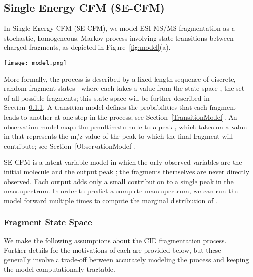\subsection{Single Energy CFM (SE-CFM)}
\label{sec:SE}

In Single Energy CFM (SE-CFM), we model ESI-MS/MS fragmentation as a stochastic, homogeneous, Markov process \citep{Cappe2005} involving state transitions between charged fragments, as depicted in Figure~\ref{fig:model}(a).
\begin{figure*}
\begin{center}
\texttt{[image: model.png]}
\caption{(a) Single Energy Competitive Fragmentation Model (SE-CFM): a stochastic, Markov process of state transitions between charged fragments. (b) Combined Energy Competitive Fragmentation Model (CE-CFM): an extension of SE-CFM that combines information from multiple collision energy spectra into one model. }\label{model}
\label{fig:model}
\end{center}
\end{figure*}

More formally, the process is described by a fixed length sequence of discrete, random fragment states , where each  takes a value from the state space
, 
the set of all possible fragments; this state space will be further described in Section~\ref{StateSpace}.
A transition model defines the probabilities that each fragment leads to another at one step in the process; see Section~\ref{TransitionModel}. 
An observation model maps the penultimate node  to a peak , which takes on a value in  that represents the m/z value of the peak to which the final fragment will contribute; see Section~\ref{ObservationModel}. 

SE-CFM is a latent variable model in which the only observed variables are the initial molecule  and the output peak ; the fragments themselves are never directly observed. 
Each output  adds only a small contribution to a single peak in the mass spectrum. In order to predict a complete mass spectrum, we can run the model forward multiple times to compute the marginal distribution of .

\subsubsection{Fragment State Space}
\label{StateSpace}

We make the following assumptions about the CID fragmentation process. Further details for the motivations of each are provided below, but these generally involve a trade-off between accurately modeling the process and keeping the model computationally tractable.

